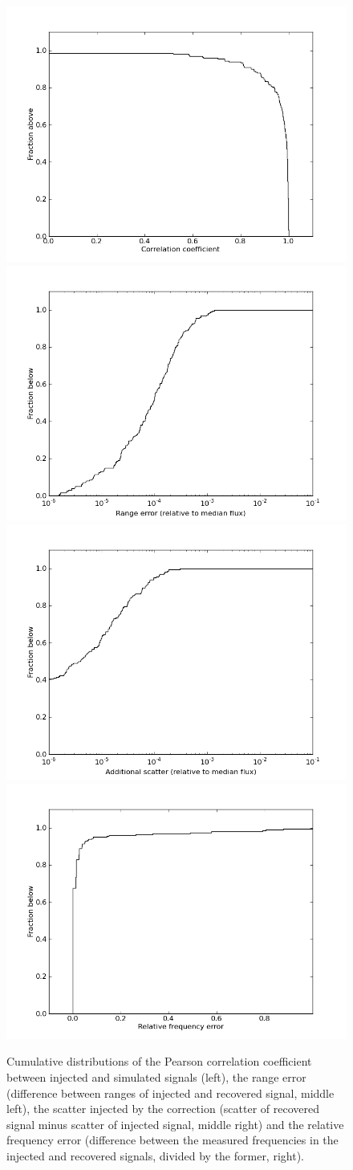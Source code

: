 \documentclass[useAMS,usenatbib]{mn2e}
\begin{document}
\begin{figure}
  \centering
  \includegraphics[width=0.245\linewidth]{inject_stat_corr_coeffs.png} \hfill
  \includegraphics[width=0.245\linewidth]{inject_stat_ranges.png} \hfill
  \includegraphics[width=0.245\linewidth]{inject_stat_scatt.png} \hfill
  \includegraphics[width=0.245\linewidth]{inject_stat_freqs.png} 
  \caption{Cumulative distributions of the Pearson correlation coefficient between
    injected and simulated signals (left), the range error (difference
    between ranges of injected and recovered signal, middle left), the scatter
    injected by the correction (scatter of recovered signal minus
    scatter of injected signal, middle right) and the relative
    frequency error (difference between the measured frequencies in
    the injected and recovered signals, divided by the former, right).}
  \label{fig:inject_stat}
\end{figure}
\end{document}

